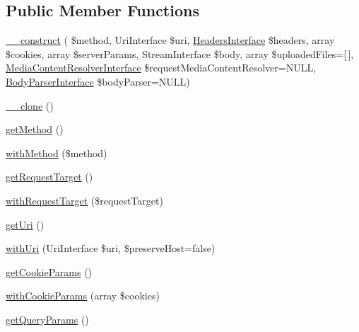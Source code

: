 \subsection*{Public Member Functions}
\begin{DoxyCompactItemize}
\item 
\mbox{\hyperlink{class_pes_1_1_http_1_1_request_a47593cf6b1ffe99d8d3d36d5a92685ba}{\+\_\+\+\_\+construct}} ( \$method, Uri\+Interface \$uri, \mbox{\hyperlink{interface_pes_1_1_http_1_1_headers_interface}{Headers\+Interface}} \$headers, array \$cookies, array \$server\+Params, Stream\+Interface \$body, array \$uploaded\+Files=\mbox{[}$\,$\mbox{]}, \mbox{\hyperlink{interface_pes_1_1_http_1_1_request_1_1_media_content_resolver_interface}{Media\+Content\+Resolver\+Interface}} \$request\+Media\+Content\+Resolver=N\+U\+LL, \mbox{\hyperlink{interface_pes_1_1_http_1_1_body_1_1_body_parser_interface}{Body\+Parser\+Interface}} \$body\+Parser=N\+U\+LL)
\item 
\mbox{\hyperlink{class_pes_1_1_http_1_1_request_ad0cb87b388bc74d63dc884accdca8713}{\+\_\+\+\_\+clone}} ()
\item 
\mbox{\hyperlink{class_pes_1_1_http_1_1_request_af3e37e1a6ed9b8c87f86f659873a83b7}{get\+Method}} ()
\item 
\mbox{\hyperlink{class_pes_1_1_http_1_1_request_ac4df752c7c8100d173304e336d665c2b}{with\+Method}} (\$method)
\item 
\mbox{\hyperlink{class_pes_1_1_http_1_1_request_a042c696b418d7e63ed4d1bb549291a84}{get\+Request\+Target}} ()
\item 
\mbox{\hyperlink{class_pes_1_1_http_1_1_request_ac3ea96f04513448629aa7b03b0fb414a}{with\+Request\+Target}} (\$request\+Target)
\item 
\mbox{\hyperlink{class_pes_1_1_http_1_1_request_a2ac86cae38fbe15a019d075d485ab702}{get\+Uri}} ()
\item 
\mbox{\hyperlink{class_pes_1_1_http_1_1_request_a1d0023caa7d9c3a9c672538692fc1456}{with\+Uri}} (Uri\+Interface \$uri, \$preserve\+Host=false)
\item 
\mbox{\hyperlink{class_pes_1_1_http_1_1_request_a9ff463aec362b0a45e64656b62d939bd}{get\+Cookie\+Params}} ()
\item 
\mbox{\hyperlink{class_pes_1_1_http_1_1_request_af76ba304dae426a1a86906ee48f6efdc}{with\+Cookie\+Params}} (array \$cookies)
\item 
\mbox{\hyperlink{class_pes_1_1_http_1_1_request_ad6cfc3d6f17c43225f95e793da56b337}{get\+Query\+Params}} ()
\item 

\end{DoxyCompactItemize}
